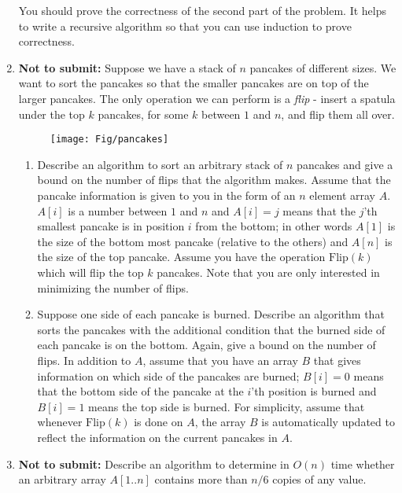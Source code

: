 \documentclass[11pt]{article}
\begin{document}
\begin{enumerate}
You should prove the correctness of the second part of the problem.
It helps to write a recursive algorithm so that you can use induction
to prove correctness.




  \item {\bf Not to submit:} Suppose we have a stack of $n$ pancakes of different sizes. We
       want to sort the pancakes so that the smaller pancakes are on
       top of the larger pancakes. The only operation we can perform
       is a {\em flip} - insert a spatula under the top $k$ pancakes,
       for some $k$ between $1$ and $n$, and flip them all over.
       \begin{figure}[h]
           \centering
           \texttt{[image: Fig/pancakes]}
       \end{figure}
       \begin{enumerate}
           \item
           Describe an algorithm to sort an arbitrary stack of $n$
           pancakes and give a bound on the number of flips that the
           algorithm makes.  Assume that the pancake information is
           given to you in the form of an $n$ element array
           $A$. $A[i]$ is a number between $1$ and $n$ and $A[i] = j$
           means that the $j$'th smallest pancake is in position $i$
           from the bottom; in other words $A[1]$ is the size of the
           bottom most pancake (relative to the others) and $A[n]$ is
           the size of the top pancake. Assume you have the operation
           $\text{Flip}(k)$ which will flip the top $k$ pancakes. Note
           that you are only interested in minimizing the number of
           flips.

           \item Suppose one side of each pancake is
           burned. Describe an algorithm that sorts the pancakes with
           the additional condition that the burned side of each
           pancake is on the bottom. Again, give a bound on the number
           of flips. In addition to $A$, assume that you have an array
           $B$ that gives information on which side of the pancakes
           are burned; $B[i]=0$ means that the bottom side of the
           pancake at the $i$'th position is burned and $B[i]=1$ means
           the top side is burned. For simplicity, assume that
           whenever $\text{Flip}(k)$ is done on $A$, the array $B$ is
           automatically updated to reflect the information on the
           current pancakes in $A$.
         \end{enumerate}
         \medskip

\item  {\bf Not to submit:}
   Describe an algorithm to determine in $O(n)$ time whether an
    arbitrary array $A[1..n]$ contains more than $n/6$ copies of any value.

\end{enumerate}
\vspace{1in}
\end{document}

